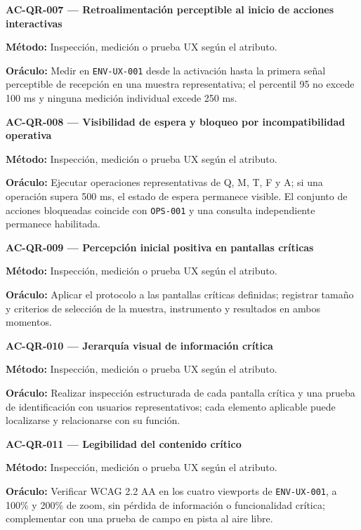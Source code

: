 \documentclass[10pt,letterpaper]{article}
\begin{document}
\noindent\textbf{AC-QR-007 --- Retroalimentación perceptible al inicio de acciones interactivas}\par
\textbf{Método:} Inspección, medición o prueba UX según el atributo.\par
\textbf{Oráculo:} Medir en \texttt{ENV-UX-001} desde la activación hasta la primera señal perceptible de recepción en una muestra representativa; el percentil 95 no excede 100 ms y ninguna medición individual excede 250 ms.\par\vspace{0.45em}
\noindent\textbf{AC-QR-008 --- Visibilidad de espera y bloqueo por incompatibilidad operativa}\par
\textbf{Método:} Inspección, medición o prueba UX según el atributo.\par
\textbf{Oráculo:} Ejecutar operaciones representativas de Q, M, T, F y A; si una operación supera 500 ms, el estado de espera permanece visible. El conjunto de acciones bloqueadas coincide con \texttt{OPS-001} y una consulta independiente permanece habilitada.\par\vspace{0.45em}
\noindent\textbf{AC-QR-009 --- Percepción inicial positiva en pantallas críticas}\par
\textbf{Método:} Inspección, medición o prueba UX según el atributo.\par
\textbf{Oráculo:} Aplicar el protocolo a las pantallas críticas definidas; registrar tamaño y criterios de selección de la muestra, instrumento y resultados en ambos momentos.\par\vspace{0.45em}
\noindent\textbf{AC-QR-010 --- Jerarquía visual de información crítica}\par
\textbf{Método:} Inspección, medición o prueba UX según el atributo.\par
\textbf{Oráculo:} Realizar inspección estructurada de cada pantalla crítica y una prueba de identificación con usuarios representativos; cada elemento aplicable puede localizarse y relacionarse con su función.\par\vspace{0.45em}
\noindent\textbf{AC-QR-011 --- Legibilidad del contenido crítico}\par
\textbf{Método:} Inspección, medición o prueba UX según el atributo.\par
\textbf{Oráculo:} Verificar WCAG 2.2 AA en los cuatro viewports de \texttt{ENV-UX-001}, a 100\% y 200\% de zoom, sin pérdida de información o funcionalidad crítica; complementar con una prueba de campo en pista al aire libre.\par\vspace{0.45em}
\end{document}
